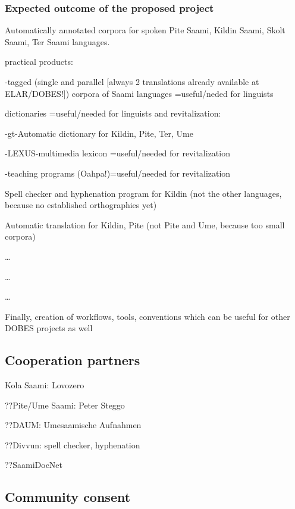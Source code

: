 \documentclass[a4paper,12pt]{article}
\begin{document}
\subsubsection{Expected outcome of the proposed project}
Automatically annotated corpora for spoken Pite Saami, Kildin Saami, Skolt Saami, Ter Saami languages.

practical products:

-tagged (single and parallel [always 2 translations already available at ELAR/DOBES!]) corpora of Saami languages =useful/neded for linguists

dictionaries =useful/needed for linguists and revitalization:

-gt-Automatic dictionary for Kildin, Pite, Ter, Ume

-LEXUS-multimedia lexicon =useful/needed for revitalization

-teaching programs (Oahpa!)=useful/needed for revitalization

Spell checker and hyphenation program for Kildin (not the other languages, because no established orthographies yet)

Automatic translation for Kildin, Pite (not Pite and Ume, because too small corpora)

…

…

…

Finally, creation of workflows, tools, conventions which can be useful for other DOBES projects as well


\subsection{Cooperation partners}
Kola Saami: Lovozero

??Pite/Ume Saami: Peter Steggo%

??DAUM: Umesaamische Aufnahmen%

??Divvun: spell checker, hyphenation

??SaamiDocNet%




\subsection{Community consent}
\end{document}
